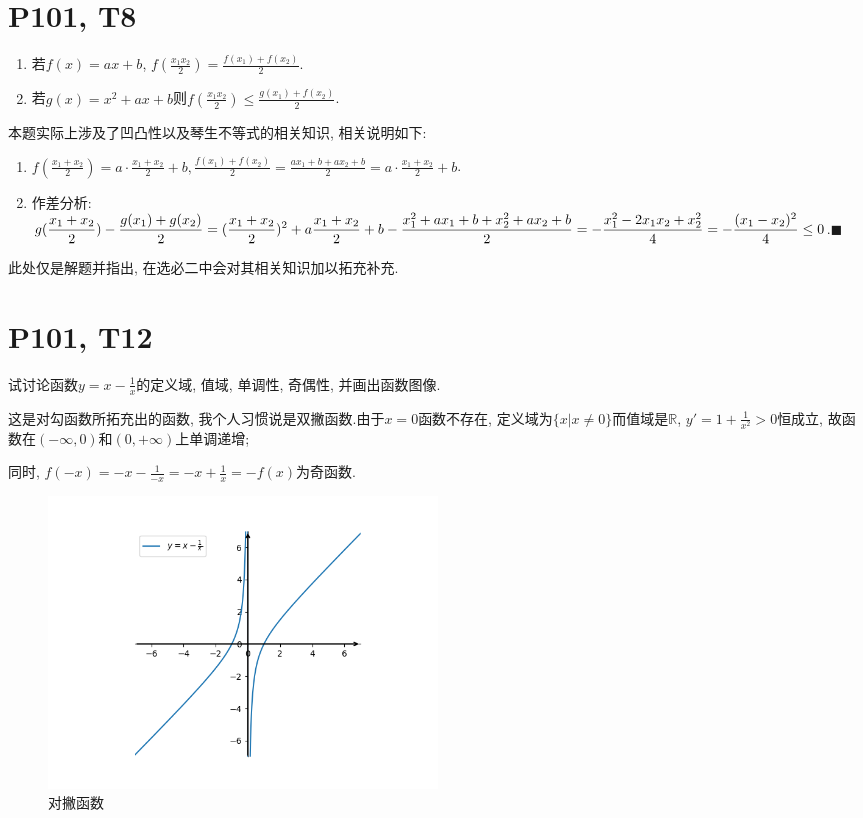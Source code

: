 \documentclass{book}
\begin{document}
    \section{\textcolor[rgb]{0.11,0.65,0.52}{P101, T8}}
    \begin{boxB}
        \begin{enumerate}
            \item 若$f(x)=ax+b$, $\displaystyle f(\frac{x_1x_2}{2})=\frac{f(x_1)+f(x_2)}{2}$.
            \item 若$g(x)=x^2+ax+b$则$\displaystyle f(\frac{x_1x_2}{2})\le \frac{g(x_1)+f(x_2)}{2}$.
        \end{enumerate}
    \end{boxB}
    本题实际上涉及了\textcolor[rgb]{0.38,0.11,0.2}{凹凸性}以及\textcolor[rgb]{0.38,0.11,0.2}{琴生不等式}的相关知识, 相关说明如下:
    \begin{enumerate}
        \doublespacing
        \item $\displaystyle f(\frac{x_1+x_2}{2})=a\cdot \frac{x_1+x_2}{2}+b, \frac{f(x_1)+f(x_2)}{2}=\frac{ax_1+b+ax_2+b}{2}=a\cdot \frac{x_1+x_2}{2}+b$.
        \item \textcolor[rgb]{0.75,0.17,0.22}{作差分析}: $\displaystyle g(\frac{x_1+x_2}{2})-\frac{g(x_1)+g(x_2)}{2}\\=(\frac{x_1+x_2}{2})^2+a\frac{x_1+x_2}{2}+b-\frac{x_1^2+ax_1+b+x_2^2+ax_2+b}{2}\\=-\frac{x_1^2-2x_1x_2+x_2^2}{4}=-\frac{(x_1-x_2)^2}{4}\le 0$.$\blacksquare$
    \end{enumerate}
    此处仅是解题并指出, 在选必二中会对其相关知识加以拓充补充.
    \section{\textcolor[rgb]{0.11,0.65,0.52}{P101, T12}}
    \begin{boxB}
        试讨论函数$\displaystyle y=x-\frac{1}{x}$的定义域, 值域, 单调性, 奇偶性, 并画出函数图像.
    \end{boxB}
    这是对勾函数所拓充出的函数, 我个人习惯说是双撇函数.由于$x=0$函数不存在, 定义域为$\{x|x\neq 0\}$而值域是$\mathbb{R}$, $y'=1+\frac{1}{x^2}>0$恒成立, 故函数在$(-\infty ,0)$和$(0,+\infty )$上单调递增;
        
    同时, $\displaystyle f(-x)=-x-\frac{1}{-x}=-x+\frac{1}{x}=-f(x)$为奇函数.
    \begin{figure}[htbp]
        \centering
        \includegraphics[width=0.5\textwidth]{img/sp.png}
        \caption{对撇函数}
    \end{figure}
\end{document}
